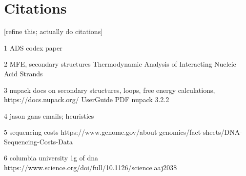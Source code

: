 \documentclass{article}
\begin{document}
\section{Citations}
[refine this; actually do citations]

1 ADS codex paper 


2 MFE, secondary structures
Thermodynamic Analysis of
Interacting Nucleic Acid Strands 

3 nupack docs on secondary structures, loops, free energy calculations,
https://docs.nupack.org/ 
UserGuide PDF nupack 3.2.2

4 jason gans emails; heuristics

5 sequencing costs 
https://www.genome.gov/about-genomics/fact-sheets/DNA-Sequencing-Costs-Data

6 columbia university 1g of dna 
https://www.science.org/doi/full/10.1126/science.aaj2038
\end{document}
